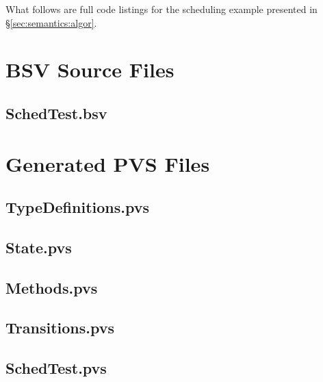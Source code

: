 What follows are full code listings for the scheduling example presented in \S \ref{sec:semantics:algor}.  

\section{BSV Source Files} \label{app:schedex:bsv}
\subsection{SchedTest.bsv} \label{app:schedex:bsv:sched}

\section{Generated PVS Files} \label{app:schedex:pvsgen}
\subsection{TypeDefinitions.pvs} \label{app:schedex:pvsgen:td}

\subsection{State.pvs} \label{app:schedex:pvsgen:state}

\subsection{Methods.pvs} \label{app:schedex:pvsgen:meth}

\subsection{Transitions.pvs} \label{app:schedex:pvsgen:trans}

\subsection{SchedTest.pvs} \label{app:schedex:pvsgen:top}
